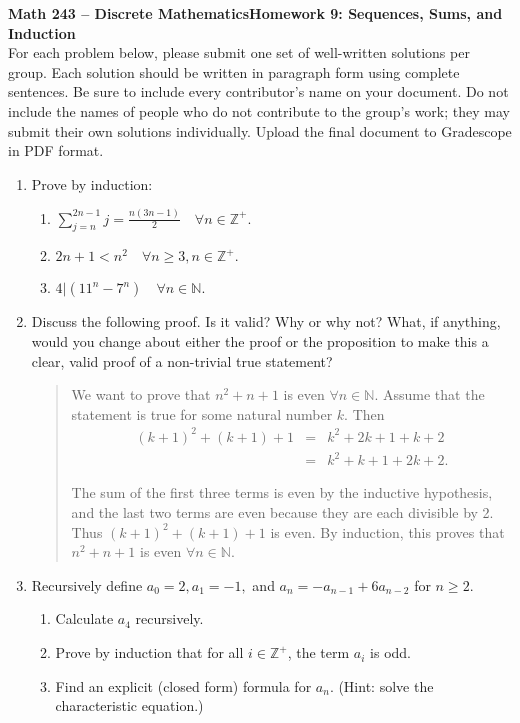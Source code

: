 \documentclass{article}
\newcommand{\N}{\mathbb{N}}
\newcommand{\Z}{\mathbb{Z}}
\begin{document}
\noindent\textbf{Math 243 -- Discrete Mathematics}\hfill\textbf{Homework 9: Sequences, Sums, and Induction }\\[0.0625in]

\noindent For each problem below, please submit one set of well-written solutions per group.  Each solution should be written in paragraph form using complete sentences. Be sure to include every contributor's name on your document.  Do not include the names of people who do not contribute to the group's work; they may submit their own solutions individually. Upload the final document to Gradescope in PDF format.


\begin{enumerate} 

\item Prove by induction:
\begin{enumerate}
\item $\sum_{j=n}^{2n-1} j = \frac{n(3n-1)}{2} \quad \forall n \in \Z^+.$
\item $2n+1 < n^2 \quad \forall n \ge 3, n \in \Z^+.$
\item $4|(11^n - 7^n) \quad \forall n \in \N.$
\end{enumerate}


\item Discuss the following proof.  Is it valid?  Why or why not?  What, if anything, would you change about either the proof or the proposition to make this a clear, valid proof of a non-trivial true statement?

\begin{quotation}
	\noindent We want to prove that $n^2 + n + 1$ is even $\forall n \in \N$.  Assume that the statement is true for some natural number $k$. Then
	\begin{equation*}
	\begin{array}{rcl}
		(k+1)^2 + (k+1) + 1 &=& k^2 + 2k + 1 + k + 2 \\
		&=& k^2 + k + 1 + 2k + 2. 
	\end{array}
	\end{equation*}
	
	\noindent The sum of the first three terms is even by the inductive hypothesis, and the last two terms are even because they are each divisible by 2.  Thus $(k+1)^2 + (k+1) + 1$ is even.  By induction, this proves that $n^2 + n + 1$ is even $\forall n \in \N$.	 
\end{quotation}

\item Recursively define $a_{0}=2, a_{1}=-1,$ and $a_{n}=-a_{n-1}+6a_{n-2}$
for $n\geq2.$

\begin{enumerate}
	\item Calculate $a_{4}$ recursively.
	\item Prove by induction that for all $i \in \Z^+$, the term $a_{i}$ is odd. 
	\item Find an explicit (closed form) formula for $a_n$.  (Hint: solve the characteristic equation.)
\end{enumerate}

\end{enumerate}
\end{document}
